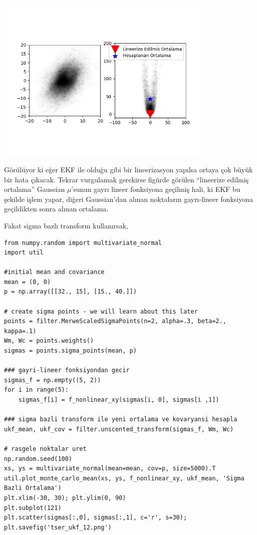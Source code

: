 \documentclass[12pt,fleqn]{article}\usepackage{../../common}
\begin{document}
\includegraphics[height=8cm]{tser_ukf_13.png}

Görülüyor ki eğer EKF ile olduğu gibi bir lineerizasyon yapılsa ortaya çok
büyük bir hata çıkacak. Tekrar vurgulamak gerekirse figürde görülen
``lineerize edilmiş ortalama'' Gaussian $\mu$'sunun gayrı lineer fonksiyona
geçilmiş hali, ki EKF bu şekilde işlem yapar, diğeri Gaussian'dan alınan
noktaların gayrı-lineer fonksiyona geçildikten sonra alınan ortalama. 

Fakat sigma bazlı transform kullanırsak,

\begin{verbatim}
from numpy.random import multivariate_normal
import util

#initial mean and covariance
mean = (0, 0)
p = np.array([[32., 15], [15., 40.]])

# create sigma points - we will learn about this later
points = filter.MerweScaledSigmaPoints(n=2, alpha=.3, beta=2., kappa=.1)
Wm, Wc = points.weights()
sigmas = points.sigma_points(mean, p)

### gayri-lineer fonksiyondan gecir
sigmas_f = np.empty((5, 2))
for i in range(5):
    sigmas_f[i] = f_nonlinear_xy(sigmas[i, 0], sigmas[i ,1])

### sigma bazli transform ile yeni ortalama ve kovaryansi hesapla
ukf_mean, ukf_cov = filter.unscented_transform(sigmas_f, Wm, Wc)

# rasgele noktalar uret
np.random.seed(100)
xs, ys = multivariate_normal(mean=mean, cov=p, size=5000).T
util.plot_monte_carlo_mean(xs, ys, f_nonlinear_xy, ukf_mean, 'Sigma Bazli Ortalama')
plt.xlim(-30, 30); plt.ylim(0, 90)
plt.subplot(121)
plt.scatter(sigmas[:,0], sigmas[:,1], c='r', s=30);
plt.savefig('tser_ukf_12.png')
\end{verbatim}
\end{document}
